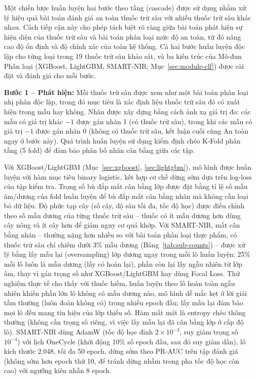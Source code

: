 \documentclass[10pt,twocolumn,twoside]{article}
\begin{document}
Một chiến lược huấn luyện hai bước theo tầng (cascade) được sử dụng nhằm xử
lý hiệu quả bài toán đánh giá an toàn thuốc trừ sâu với nhiều thuốc trừ sâu
khác nhau. Cách tiếp cận này cho phép tách biệt rõ ràng giữa bài toán phát
hiện sự hiện diện của thuốc trừ sâu và bài toán phân loại mức độ an toàn,
từ đó nâng cao độ ổn định và độ chính xác của toàn hệ thống. Cả hai bước
huấn luyện độc lập cho từng loại trong 19 thuốc trừ sâu khảo sát, và ba
kiến trúc của Mô-đun Phân loại (XGBoost, LightGBM, SMART-NIR;
Mục~\ref{sec:module-clf}) được cài đặt và đánh giá cho mỗi bước.

\textbf{Bước 1 -- Phát hiện:} Mỗi thuốc trừ sâu được xem như một bài toán
phân loại nhị phân độc lập, trong đó mục tiêu là xác định liệu thuốc trừ sâu
đó có xuất hiện trong mẫu hay không. Nhãn được xây dựng bằng cách ánh xạ giá
trị đo: các mẫu có giá trị khác $-1$ được gán nhãn 1 (có thuốc trừ sâu),
trong khi các mẫu có giá trị $-1$ được gán nhãn 0 (không có thuốc trừ sâu,
kết luận cuối cùng An toàn ngay ở bước này). Quá trình huấn luyện sử dụng
kiểm định chéo K-Fold phân tầng (5 fold) để đảm bảo phân bố nhãn cân bằng
giữa các tập.

Với XGBoost/LightGBM (Mục~\ref{sec:xgboost}, \ref{sec:lightgbm}), mô hình
được huấn luyện với hàm mục tiêu binary logistic, kết hợp cơ chế dừng sớm
dựa trên log-loss của tập kiểm tra. Trọng số bù đắp mất cân bằng lớp được
đặt bằng tỉ lệ số mẫu âm/dương của fold huấn luyện để bù đắp mất cân bằng
nhãn mà không cần loại bỏ dữ liệu. Độ phức tạp cây (số cây, độ sâu tối đa,
tốc độ học) được điều chỉnh theo số mẫu dương của từng thuốc trừ sâu --
thuốc có ít mẫu dương hơn dùng cây nông và ít cây hơn để giảm nguy cơ quá
khớp. Với SMART-NIR, mất cân bằng nhãn -- thường nặng hơn nhiều
so với bài toán phân loại thực phẩm, có thuốc trừ sâu chỉ chiếm dưới 3\%
mẫu dương (Bảng~\ref{tab:sub-counts}) -- được xử lý bằng lấy mẫu lại
(oversampling) lớp dương ngay trong mỗi lô huấn luyện: 25\% mỗi lô luôn là
mẫu dương (lấy có hoàn lại), phần còn lại lấy ngẫu nhiên từ lớp âm, thay vì
gán trọng số như XGBoost/LightGBM hay dùng Focal Loss. Thử nghiệm thực tế
cho thấy với thuốc hiếm, huấn luyện theo lô hoàn toàn ngẫu nhiên khiến phần
lớn lô không có mẫu dương nào, mô hình dễ mắc kẹt ở lời giải tầm thường
(luôn đoán không có) trong nhiều epoch đầu; lấy mẫu lại đảm bảo mọi lô đều
mang tín hiệu của lớp thiểu số. Hàm mất mát là entropy chéo thông thường
(không cần trọng số riêng, vì việc lấy mẫu lại đã cân bằng lớp ở cấp độ lô).
SMART-NIR dùng AdamW (tốc độ học đỉnh $2{\times}10^{-3}$, suy giảm trọng số
$10^{-4}$) với lịch OneCycle (khởi động 10\% số epoch đầu, sau đó suy giảm
dần), lô kích thước 2.048, tối đa 50 epoch, dừng sớm theo PR-AUC trên tập
đánh giá (không sớm hơn epoch thứ 10, để tránh dừng nhầm trong pha tốc độ
học còn cao) với ngưỡng kiên nhẫn 8 epoch.
\end{document}
